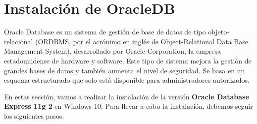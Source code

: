 \section{Instalación de OracleDB}
Oracle Database es un sistema de gestión de base de datos de tipo objeto-relacional (ORDBMS, por el acrónimo en inglés de Object-Relational Data Base Management System), desarrollado por Oracle Corporation, la empresa estadounidense de hardware y software. Este tipo de sistema mejora la gestión de grandes bases de datos y también aumenta el nivel de seguridad. Se basa en un esquema estructurado que solo está disponible para administradores autorizados. \cite{oracle}

En estas sección, vamos a realizar la instalación de la versión \textbf{Oracle Database Express 11g 2} en Windows 10. Para llevar a cabo la instalación, debemos seguir los siguientes pasos:

